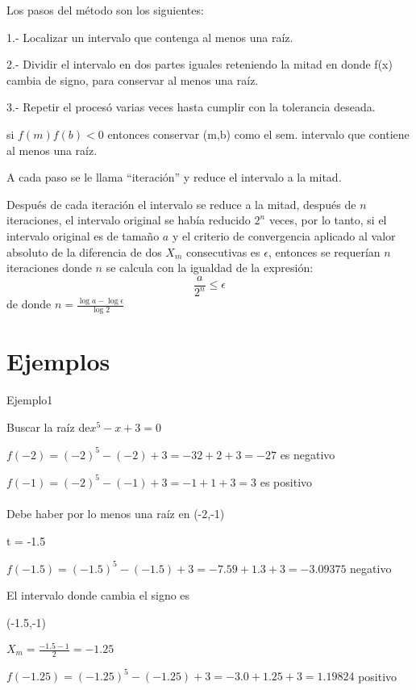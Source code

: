 \documentclass{article}
\begin{document}
\begin{multicols}{2}
Los pasos del método son los siguientes: 

1.- Localizar un intervalo que contenga al menos una raíz.

2.- Dividir el intervalo en dos partes iguales reteniendo la mitad en donde f(x) cambia de signo, para conservar al menos una raíz.

3.- Repetir el procesó varias veces hasta cumplir con la tolerancia deseada.


si $f(m) f(b)<0$ entonces conservar (m,b) como el sem. intervalo que contiene al menos una raíz.

A cada paso se le llama “iteración”  y reduce el intervalo a la mitad.

Después de cada iteración el intervalo se reduce a la mitad, después de $n$ iteraciones, el intervalo original se había reducido $2^{n}$ veces, por lo tanto, si el intervalo original  es de tamaño $a$ y el criterio de convergencia aplicado al valor absoluto de la diferencia de dos $X_{m}$ consecutivas es  $ \epsilon $, entonces se requerían $n$ iteraciones donde $n$ se calcula con la igualdad de la expresión:
\begin{equation}
\frac{a}{2^{n}} \leq \epsilon
\end{equation}
de donde $n=\frac{\log a - \log \epsilon}{\log 2} $
\section{Ejemplos}
\label{sec:Ejem}
Ejemplo1

Buscar la raíz de$ x^{5} - x + 3  = 0 $

    $f (-2) = (-2)^{5} - (-2) + 3 = -32 + 2 + 3 = -27  $       es negativo

    $f (-1) = (-2)^5 - (-1) + 3 = -1 + 1 + 3 = 3 $         es positivo
\\
\\
Debe haber por lo menos una raíz en (-2,-1)  

                        t = -1.5

$f (-1.5) = (-1.5)^{5} - (-1.5) + 3 = - 7.59 + 1.3 + 3 = -3.09375$ negativo

El intervalo donde cambia el signo es

     (-1.5,-1)

\begin{center}
$X_{m}=\frac{-1.5-1}{2}=-1.25$
\end{center}
	

    $ f (-1.25) = (-1.25)^5 - (-1.25) + 3 = -3.0 + 1.25 + 3 = 1.19824 $ positivo




\end{multicols}
\end{document}

